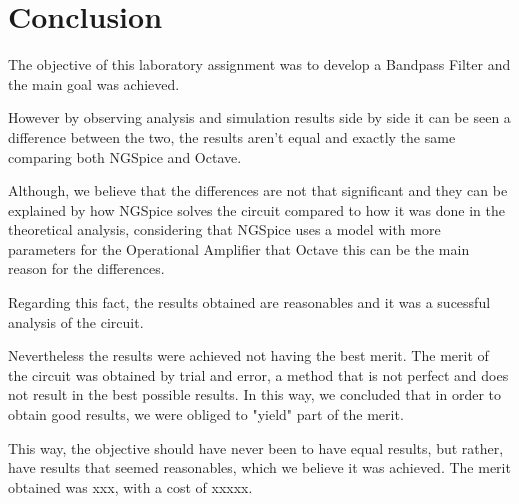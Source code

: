 \newpage
\section{Conclusion}
\label{sec:conclusion}

\hspace{0,5cm} The objective of this laboratory assignment was to develop a Bandpass Filter and the main goal was achieved. 

\par However by observing analysis and simulation results side by side it can be seen a difference between the two, the results aren't equal and exactly the same comparing both NGSpice and Octave. 
\par Although, we believe that the differences are not that significant and they can be explained by how NGSpice solves the circuit compared to how it was done in the theoretical analysis, considering that NGSpice uses a model with more parameters for the Operational Amplifier that Octave this can be the main reason for the differences. 
\par Regarding this fact, the results obtained are reasonables and it was  a sucessful analysis of the circuit.
\par Nevertheless the results were achieved not having the best merit. The merit of the circuit was obtained by trial and error, a method that is not perfect and does not result in the best possible results. In this way, we concluded that in order to obtain good results, we were obliged to "yield" part of the merit.
\par This way, the objective should have never been to have equal results, but rather, have results that seemed reasonables, which we believe it was achieved. The merit obtained was xxx, with a cost of xxxxx.



